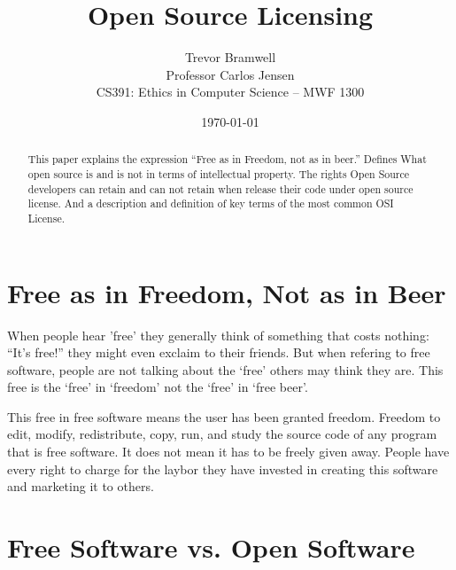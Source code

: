 \documentclass[12pt,letterpaper]{article}
\title{Open Source Licensing}
\author{
    Trevor Bramwell\\
    Professor Carlos Jensen\\
    CS391: Ethics in Computer Science -- MWF 1300\\
}
\date{\today}
\begin{document}
\maketitle

\begin{abstract}
This paper explains the expression ``Free as in Freedom, not as in
beer.'' Defines What open source is and is not in terms of intellectual 
property. The rights Open Source developers can retain and can not retain 
when release their code under open source license. And a description and
definition of key terms of the most common OSI License.
\end{abstract}

\section{Free as in Freedom, Not as in Beer}
When people hear 'free' they generally think of something that costs
nothing: ``It's free!'' they might even exclaim to their friends. But
when refering to free software, people are not talking about the `free'
others may think they are. This free is the `free' in `freedom' not
the `free' in `free beer'.

This free in free software means the user has been granted freedom.
Freedom to edit, modify, redistribute, copy, run, and study the source
code of any program that is free software. It does not mean it has to be
freely given away. People have every right to charge for the laybor they
have invested in creating this software and marketing it to others.

\section{Free Software vs. Open Software}

\pagebreak

\end{document}
